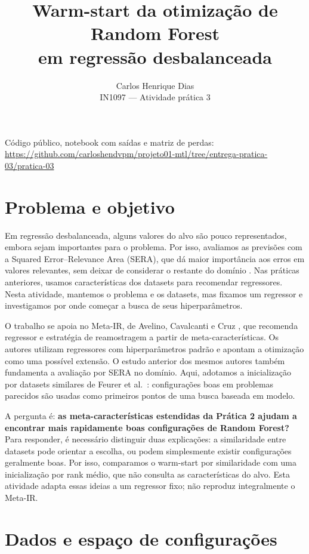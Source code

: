 \documentclass[10pt,a4paper]{article}
\title{Warm-start da otimização de Random Forest\\em regressão desbalanceada}
\author{Carlos Henrique Dias\\\small IN1097 --- Atividade prática 3}
\date{}
\begin{document}
\maketitle
\vspace{-0.5cm}
\begin{center}\small
Código público, notebook com saídas e matriz de perdas:\\
\url{https://github.com/carloshendvpm/projeto01-mtl/tree/entrega-pratica-03/pratica-03}
\end{center}

\section{Problema e objetivo}

Em regressão desbalanceada, alguns valores do alvo são pouco representados, embora sejam importantes para o problema. Por isso, avaliamos as previsões com a Squared Error--Relevance Area (SERA), que dá maior importância aos erros em valores relevantes, sem deixar de considerar o restante do domínio \cite{ribeiro}. Nas práticas anteriores, usamos características dos datasets para recomendar regressores. Nesta atividade, mantemos o problema e os datasets, mas fixamos um regressor e investigamos por onde começar a busca de seus hiperparâmetros.

O trabalho se apoia no Meta-IR, de Avelino, Cavalcanti e Cruz \cite{metair}, que recomenda regressor e estratégia de reamostragem a partir de meta-características. Os autores utilizam regressores com hiperparâmetros padrão e apontam a otimização como uma possível extensão. O estudo anterior dos mesmos autores \cite{resampling} também fundamenta a avaliação por SERA no domínio. Aqui, adotamos a inicialização por datasets similares de Feurer et al.\ \cite{feurer}: configurações boas em problemas parecidos são usadas como primeiros pontos de uma busca baseada em modelo.

A pergunta é: \textbf{as meta-características estendidas da Prática 2 ajudam a encontrar mais rapidamente boas configurações de Random Forest?} Para responder, é necessário distinguir duas explicações: a similaridade entre datasets pode orientar a escolha, ou podem simplesmente existir configurações geralmente boas. Por isso, comparamos o warm-start por similaridade com uma inicialização por rank médio, que não consulta as características do alvo. Esta atividade adapta essas ideias a um regressor fixo; não reproduz integralmente o Meta-IR.

\section{Dados e espaço de configurações}
\end{document}
